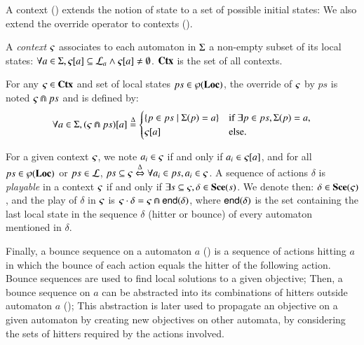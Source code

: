 A context () extends the notion of state to a set of possible initial states:
We also extend the override operator to contexts ().
\begin{definition}
\label{def:context}
  A \emph{context} $\varsigma$ associates to each automaton in $\Sigma$ a non-empty subset of its local states:
  $\forall a \in \Sigma, {\varsigma[a]} \subseteq \mathcal{L}_a \wedge {\varsigma[a]} \neq \emptyset$.
  $\mathbf{Ctx}$ is the set of all contexts.
\end{definition}
%
\begin{definition}[$\Cap: \Ctx \times \powerset(\PHproc) \rightarrow \Ctx$]
\label{def:ctxcap}
  For any $\varsigma\in\mathbf{Ctx}$ and set of local states $ps \in \wp(\mathbf{Loc})$,
  the override of $\varsigma$ by $ps$ is noted $\varsigma \Cap ps$ and is defined by:
  \[ \forall a \in \Sigma, {(\varsigma \Cap ps)[a]} \stackrel{\Delta}=
  \begin{cases}
    \{ p \in ps \mid \Sigma(p)=a \} & \text{if } \exists p \in ps, \Sigma(p)=a,\\
    {\varsigma[a]} & \text{else.}
  \end{cases}
  \]
\end{definition}
\noindent
For a given context $\varsigma$, we note $a_i \in \varsigma$ if and only if $a_i \in {\varsigma[a]}$,
and for all $ps \in \wp(\mathbf{Loc})$ or $ps \in \mathcal{L}$, $ps \subseteq \varsigma \stackrel{\Delta}\Leftrightarrow \forall a_i \in ps, a_i \in \varsigma$.
A sequence of actions $\delta$ is \emph{playable} in a context $\varsigma$ if and only if 
$\exists s \subseteq \varsigma, \delta \in \mathbf{Sce}(s)$.
We denote then: $\delta \in \mathbf{Sce}(\varsigma)$,
and the play of $\delta$ in $\varsigma$ is $\varsigma \cdot \delta = \varsigma \Cap \mathsf{end}(\delta)$,
where $\mathsf{end}(\delta)$ is the set containing the last local state in the sequence $\delta$ (hitter or bounce) of every automaton mentioned in $\delta$.

Finally, a bounce sequence on a automaton $a$ () is a sequence of actions hitting $a$
in which the bounce of each action equals the hitter of the following action.
Bounce sequences are used to find local solutions to a given objective;
%
Then, a bounce sequence on $a$ can be abstracted into
its combinations of hitters outside automaton $a$ ();
This abstraction is later used to propagate an objective on a given automaton
by creating new objectives on other automata,
by considering the sets of hitters required by the actions involved.

